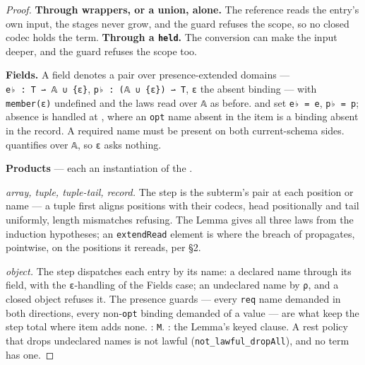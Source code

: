 \begin{proof}
\textbf{Through wrappers, or a union, alone.} The reference reads the entry's own input, the stages never
grow, and the guard refuses the scope, so no closed codec holds the term. \textbf{Through a \texttt{held}.} The
conversion can make the input deeper, and the guard refuses the scope too.

\textbf{Fields.} A field denotes a pair over presence-extended domains — \texttt{e♭\ :\ T\ ⇀\ 𝔸\ ∪\ \{ε\}},
\texttt{p♭\ :\ (𝔸\ ∪\ \{ε\})\ ⇀\ T}, \texttt{ε} the absent binding — with \texttt{member(ε)} undefined and the laws read over
\texttt{𝔸} as before.  and  set \texttt{e♭\ =\ e}, \texttt{p♭\ =\ p}; absence is handled at ,
where an \texttt{opt} name absent in the item is a binding absent in the record. A required name
must be present on both current-schema sides.
 quantifies over \texttt{𝔸}, so \texttt{ε} asks nothing.

\textbf{Products} — each an instantiation of the .

\emph{array, tuple, tuple-tail, record.} The step is the subterm's pair at each position or name — a
tuple first aligns positions with their codecs, head positionally and tail uniformly, length
mismatches refusing. The Lemma gives all three laws from the induction hypotheses; an \texttt{extendRead}
element is where the breach of  propagates, pointwise, on the positions it rereads,
per §2.

\emph{object.} The step dispatches each entry by its name: a declared name through its field, with the
\texttt{ε}-handling of the Fields case; an undeclared name by \texttt{ρ}, and a closed object refuses it. The presence guards — every \texttt{req} name demanded in
both directions, every non-\texttt{opt} binding demanded of a value — are what keep the step total where
item adds none. : \texttt{M}. : the Lemma's keyed clause. A rest
policy that drops undeclared names is not lawful (\texttt{not\_lawful\_dropAll}), and no term has one.


\end{proof}
